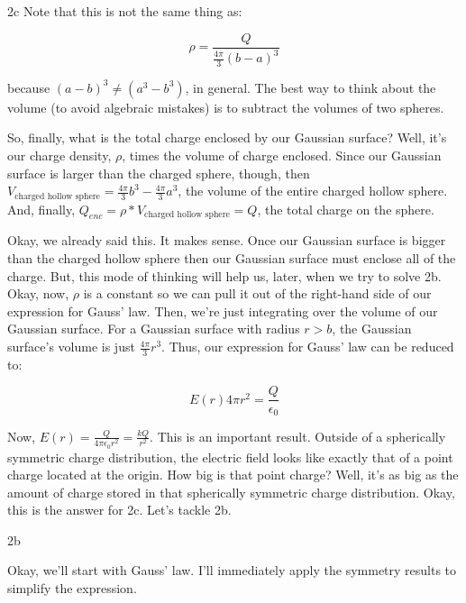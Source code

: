 \begin{homeworkProblem}[Quiz 3, Pr. 2]
\begin{homeworkSection}{2c}
        Note that this is not the same thing as:
       
        \[ \rho = \frac{Q}{\frac{4\pi}{3}(b - a)^3} \]
        
        because $(a-b)^3 \ne (a^3-b^3)$, in general. The best way to
        think about the volume (to avoid algebraic mistakes) is to
        subtract the volumes of two spheres.

        So, finally, what is the total charge enclosed by our Gaussian
        surface? Well, it's our charge density, $\rho$, times the volume
        of charge enclosed. Since our Gaussian surface is larger than
        the charged sphere, though, then $V_{\text{charged hollow
        sphere}} = \frac{4\pi}{3}b^3 - \frac{4\pi}{3}a^3$, the volume of
        the entire charged hollow sphere. And, finally, $Q_{enc} =
        \rho*V_{\text{charged hollow sphere}} = Q$, the total charge on the
        sphere.

        Okay, we already said this. It makes sense. Once our Gaussian
        surface is bigger than the charged hollow sphere then our
        Gaussian surface must enclose all of the charge. But, this mode
        of thinking will help us, later, when we try to solve 2b. Okay,
        now, $\rho$ is a constant so we can pull it out of the
        right-hand side of our expression for Gauss' law. Then, we're
        just integrating over the volume of our Gaussian surface. For a
        Gaussian surface with radius $r>b$, the Gaussian surface's
        volume is just $\frac{4\pi}{3} r^3$. Thus, our expression for
        Gauss' law can be reduced to:

        \[
            E(r) 4\pi r^2 = \frac{Q}{\epsilon_0}
        \]

        Now, $E(r) = \frac{Q}{4\pi\epsilon_0 r^2} = \frac{kQ}{r^2}$.
        This is an important result. Outside of a spherically symmetric
        charge distribution, the electric field looks like exactly that of
        a point charge located at the origin. How big is that point
        charge? Well, it's as big as the amount of charge stored in that
        spherically symmetric charge distribution. Okay, this is the
        answer for 2c. Let's tackle 2b.
        
    \end{homeworkSection}
    \begin{homeworkSection}{2b}

        Okay, we'll start with Gauss' law. I'll immediately apply the
        symmetry results to simplify the expression.


\end{homeworkSection}
\end{homeworkProblem}
